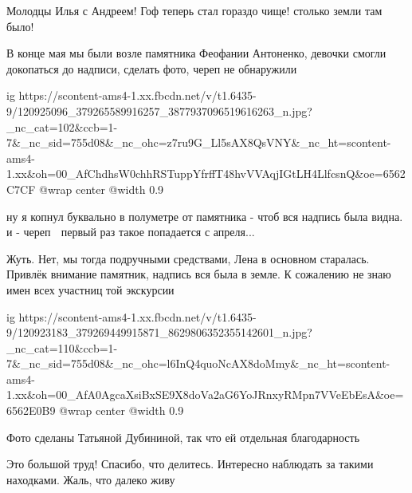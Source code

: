  
 
 
 
 

\clearpage
\qqSecCmt


Молодцы Илья с Андреем! Гоф теперь стал гораздо чище! столько земли там было!


В конце мая мы были возле памятника Феофании Антоненко, девочки смогли
докопаться до надписи, сделать фото, череп не обнаружили

\ifcmt
  ig https://scontent-ams4-1.xx.fbcdn.net/v/t1.6435-9/120925096_379265589916257_3877937096519616263_n.jpg?_nc_cat=102&ccb=1-7&_nc_sid=755d08&_nc_ohc=z7ru9G_Ll5sAX8QsVNY&_nc_ht=scontent-ams4-1.xx&oh=00_AfChdhsW0chhRSTuppYfrffT48hvVVAqjIGtLH4LlfcsnQ&oe=6562C7CF
  @wrap center
  @width 0.9
\fi

\begin{itemize} %

ну я копнул буквально в полуметре от памятника - чтоб вся надпись была видна. и
- череп 🙁 первый раз такое попадается с апреля...


Жуть. Нет, мы тогда подручными средствами, Лена в основном старалась. Привлёк
внимание памятник, надпись вся была в земле. К сожалению не знаю имен всех
участниц той экскурсии

\end{itemize} %


\ifcmt
  ig https://scontent-ams4-1.xx.fbcdn.net/v/t1.6435-9/120923183_379269449915871_8629806352355142601_n.jpg?_nc_cat=110&ccb=1-7&_nc_sid=755d08&_nc_ohc=l6InQ4quoNcAX8doMmy&_nc_ht=scontent-ams4-1.xx&oh=00_AfA0AgcaXsiBxSE9X8doVa2aG6YoJRnxyRMpn7VVeEbEsA&oe=6562E0B9
  @wrap center
  @width 0.9
\fi


Фото сделаны Татьяной Дубининой, так что ей отдельная благодарность


Это большой труд! Спасибо, что делитесь. Интересно наблюдать за такими
находками. Жаль, что далеко живу
